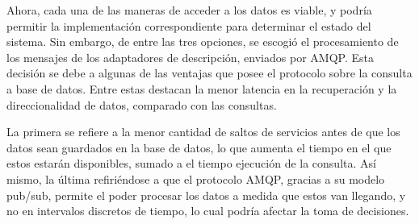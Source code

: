 Ahora, cada una de las maneras de acceder a los datos es viable, y podría permitir la implementación correspondiente para determinar el estado del sistema. Sin embargo, de entre las tres opciones, se escogió el procesamiento de los mensajes de los adaptadores de descripción, enviados por AMQP. Esta decisión se debe a algunas de las ventajas que posee el protocolo sobre la consulta a base de datos. Entre estas destacan la menor latencia en la recuperación y la direccionalidad de datos, comparado con las consultas. 

La primera se refiere a la menor cantidad de saltos de servicios antes de que los datos sean guardados en la base de datos, lo que aumenta el tiempo en el que estos estarán disponibles, sumado a el tiempo ejecución de la consulta. Así mismo, la última refiriéndose a que el protocolo AMQP, gracias a su modelo pub/sub, permite el poder procesar los datos a medida que estos van llegando, y no en intervalos discretos de tiempo, lo cual podría afectar la toma de decisiones.

